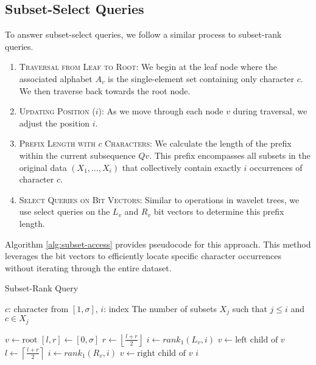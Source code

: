 \subsection{Subset-Select Queries}

To answer subset-select queries, we follow a similar process to subset-rank queries.

\begin{enumerate}
    \item \textsc{Traversal from Leaf to Root:} We begin at the leaf node where the associated alphabet $A_v$ is the single-element set containing only character $c$. We then traverse back towards the root node.
    \item \textsc{Updating Position} ($i$): As we move through each node $v$ during traversal, we adjust the position $i$.
    \item \textsc{Prefix Length with $c$ Characters}: We calculate the length of the prefix within the current subsequence $Qv$. This prefix encompasses all subsets in the original data $(X_1,\dots, X_i)$ that collectively contain exactly $i$ occurrences of character $c$.
    \item \textsc{Select Queries on Bit Vectors}: Similar to operations in wavelet trees, we use select queries on the $L_v$ and $R_v$ bit vectors to determine this prefix length.
\end{enumerate}

\noindent Algorithm \ref{alg:subset-access} provides pseudocode for this approach. This method leverages the bit vectors to efficiently locate specific character occurrences without iterating through the entire dataset.

\begin{algorithm}[h]
    \caption{Subset-Rank Query}
    \label{alg:subset-rank}
    \begin{algorithmic}[1]
        \Require $c$: character from $[1, \sigma]$, $i$: index
        \Ensure The number of subsets $X_j$ such that $j \leq i$ and $c \in X_j$
    \end{algorithmic}
    \begin{algorithmic}
        \State $v \gets \text{root}$
        \State $[l, r] \gets [0, \sigma]$ 
        \State $r \gets \left\lfloor \frac{l+r}{2} \right\rfloor$
        \State $i \gets rank_1(L_v, i)$
        \State $v \gets \text{left child of } v$
        \Else
        \State $l \gets \left\lceil \frac{l+r}{2} \right\rceil$
        \State $i \gets rank_1(R_v, i)$
        \State $v \gets \text{right child of } v$
        \EndIf
        \EndWhile
        \State \Return $i$
        \EndFunction
    \end{algorithmic}
\end{algorithm}

